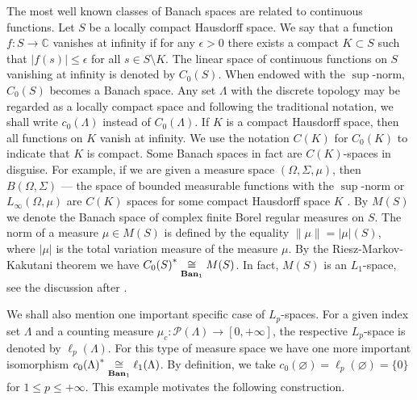 The most well known classes of Banach spaces are related to continuous
functions. Let $S$ be a locally compact Hausdorff space. We say that a function
$f:S\to\mathbb{C}$ vanishes at infinity  if for any $\epsilon>0$ there exists a
compact $K\subset S$ such that $|f(s)|\leq\epsilon$ for all $s\in S\setminus K$.
The linear space of continuous functions on $S$ vanishing at infinity is denoted
by $C_0(S)$. When endowed with the $\sup$-norm, $C_0(S)$ becomes a Banach space. Any
set $\Lambda$ with the discrete topology may be regarded as a locally compact space
and following the traditional notation, we shall write $c_0(\Lambda)$ instead of
$C_0(\Lambda)$. If $K$ is a compact Hausdorff space, then all functions on $K$
vanish at infinity. We use the notation $C(K)$ for $C_0(K)$ to indicate that $K$
is compact. Some Banach spaces in fact are $C(K)$-spaces in disguise. For
example, if we are given a measure space $(\Omega,\Sigma,\mu)$, then
$B(\Omega,\Sigma)$ --- the space of bounded measurable functions with
the $\sup$-norm or $L_\infty(\Omega,\mu)$ are $C(K)$ spaces for some compact
Hausdorff space $K$ \cite[remark 4.2.8]{KalAlbTopicsBanSpTh}. 
By $M(S)$ we denote the Banach space of
complex finite Borel regular measures on $S$. The norm of a measure $\mu\in M(S)$
is defined by the equality $\lVert\mu\rVert=|\mu|(S)$, where $|\mu|$ is the total
variation measure of the measure $\mu$. By the Riesz-Markov-Kakutani theorem
\cite[section C.18]{ConwACoursInFuncAn} we have
${C_0(S)}^*\mathrel{\mathop{\cong}\limits_{\mathbf{Ban}_1}}M(S)$. In fact, $M(S)$ is an $L_1$-space, see
the discussion after \cite[proposition 2.14]{DalLauSecondDualOfMeasAlg}. 

We shall also mention one important specific case of $L_p$-spaces. For a given
index set $\Lambda$ and a counting measure
$\mu_c:\mathcal{P}(\Lambda)\to[0,+\infty]$, the respective $L_p$-space is denoted
by $\ell_p(\Lambda)$. For this type of measure space we have one more important
isomorphism ${c_0(\Lambda)}^*\mathrel{\mathop{\cong}\limits_{\mathbf{Ban}_1}}\ell_1(\Lambda)$. By definition, 
we take $c_0(\varnothing)=\ell_p(\varnothing)= \{0 \}$ for 
$1\leq p\leq+\infty$. This example motivates the following construction.

